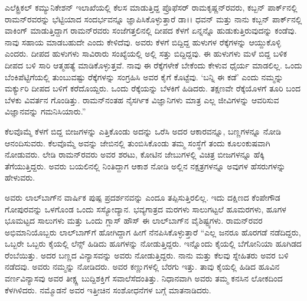 ಎಲೆಕ್ಟ್ರಿಕಲ್ ಕಮ್ಯುನಿಕೇಶನ್ ಇಲಾಖೆಯಲ್ಲಿ ಕೆಲಸ ಮಾಡುತ್ತಿದ್ದ ಪ್ರೊಫೆಸರ್ ರಾಮಕೃಷ್ಣನ್‌ರವರು, ಕಬ್ಬನ್ ಪಾರ್ಕ್‌ನಲ್ಲಿ ರಾಮನ್‌ರವರನ್ನು ಭೆಟ್ಟಿಯಾದ ಸಂದರ್ಭವನ್ನೂ ಜ್ಞಾಪಿಸಿಕೊಳ್ಳುತ್ತಾರೆ \enginline{-} ಡಾ।। ಧವನ್ ಮತ್ತು ನಾನು ಕಬ್ಬನ್ ಪಾರ್ಕ್‌ನಲ್ಲಿ ವಾಕಿಂಗ್ ಮಾಡುತ್ತಿದ್ದಾಗ ರಾಮನ್‌ರವರು ಸಂಜೆಗತ್ತಲಿನಲ್ಲಿ ದೀಪದ ಕೆಳಗೆ ಏನ್ನನ್ನೊ ಹುಡುಕುತ್ತಿರುವುದನ್ನು ಕಂಡೆವು. ನಾವು ಸಹಾಯ ಮಾಡಬಹುದೇ ಎಂದು ಕೇಳಿದೆವು. ಅವರು ಕೆಳಗೆ ಬಿದ್ದಿದ್ದ ಹುಳುಗಳ ರೆಕ್ಕೆಗಳನ್ನು ಆಯ್ದುಕೊಳ್ಳಿ ಎಂದರು. ದೀಪದ ಹುಳುಗಳು ಸಾವಿರಾರು ಸಂಖ್ಯೆಯಲ್ಲಿ ಅಲ್ಲಿ ಸತ್ತು ಬಿದ್ದಿದ್ದವು. ಈ ಹುಳುಗಳು ಮಳೆ ಬಿದ್ದ ಬಳಿಕ ದೀಪದ ಬಳಿ ಸಾರಿ ಆತ್ಮಹತ್ಯೆ ಮಾಡಿಕೊಳ್ಳುತ್ತವೆ. ನಾವು ಈ ರೆಕ್ಕೆಗಳೇಕೆ ಬೇಕೆಂದು ಕೇಳುವ ಧೈರ್ಯ ಮಾಡಲಿಲ್ಲ. ಒಂದು ಬೆಂಕಿಪೆಟ್ಟಿಗೆಯಲ್ಲಿ ತುಂಬುವಷ್ಟು ರೆಕ್ಕೆಗಳನ್ನು ಸಂಗ್ರಹಿಸಿ ಅವರ ಕೈಗೆ ಕೊಟ್ಟೆವು. ‘ಬನ್ನಿ ಈ ಕಡೆ’ ಎಂದು ನಮ್ಮನ್ನು ಮರ್ಕ್ಯುರಿ ದೀಪದ ಬಳಿಗೆ ಕರೆದೊಯ್ದರು. ಒಂದು ರೆಕ್ಕೆಯನ್ನು ಬೆಳಕಿಗೆ ಹಿಡಿದರು. ತಕ್ಷಣವೇ ರೆಕ್ಕೆಯೊಳಗೆ ತೂರಿ ಬಂದ ಬೆಳಕು ವಿವರ್ತನ ಗೊಂಡಿತ್ತು. ರಾಮನ್‌ನಂತಹ ನೈಸರ್ಗಿಕ ವಿಜ್ಞಾನಿಗಳು ಮಾತ್ರ ಎಲ್ಲ ಜೀವಿಗಳನ್ನು ಆವರಿಸುವ ವಿಜ್ಞಾನವನ್ನು ಗಮನಿಸಿಯಾರು.” 

ಕೆಲವೊಮ್ಮೆ ಕೆಳಗೆ ಬಿದ್ದ ಬೀಜಗಳನ್ನು ಎತ್ತಿಕೊಂಡು ಅದನ್ನು ಒರೆಸಿ ಅದರ ಆಕಾರವನ್ನೂ, ಬಣ್ಣಗಳನ್ನೂ ನೋಡಿ ಆನಂದಿಸುವರು. ಕೆಲವೊಮ್ಮೆ ಅವನ್ನು ಜೇಬಿನಲ್ಲಿ ತುಂಬಿಸಿಕೊಂಡು ತಮ್ಮ ಸಂಸ್ಥೆಗೆ ತಂದು ಕೂಲಂಕುಷವಾಗಿ ನೋಡುವರು. ಲೇಡಿ ರಾಮನ್‌ರವರು ಅವರ ಶರಟು, ಕೋಟಿನ ಜೇಬುಗಳಲ್ಲಿ ವಿಚಿತ್ರ ಬೀಜಗಳನ್ನೂ ಹೆಕ್ಕಿ ತೆಗೆಯುತ್ತಿದ್ದರು. ಅವರು ಬಯಲಿನಲ್ಲಿ ನಿಂತಿದ್ದಾಗ ಆಕಾಶ ನೋಡಿ ಅಲ್ಲಿನ ನಕ್ಷತ್ರಗಳನ್ನೂ ಅವುಗಳ ಹೆಸರುಗಳನ್ನು ಹೇಳುವರು. 

ಅವರು ಲಾಲ್‌ಬಾಗ್‍ನ ವಾರ್ಷಿಕ ಪುಷ್ಪ ಪ್ರದರ್ಶನವನ್ನು ಎಂದೂ ತಪ್ಪಿಸುತ್ತಿರಲಿಲ್ಲ. ಇದು ದಕ್ಷಿಣದ ಕೆಂಪೇಗೌಡ ಗೋಪುರವನ್ನು ಒಳಗೊಂಡ ಒಂದು ಸಸ್ಯೋದ್ಯಾನ. ಭವ್ಯಗಾತ್ರದ ಮರಗಳು ಸಾಲುಗಟ್ಟಲೆ ಹೂಮರಗಳು, ಹೂಗಳ ಭೂಮಟ್ಟದ ಸಾಲುಗಳು ಮತ್ತು ಒಂದು ಗ್ಲಾಸ್ ಹೌಸ್ ಈ ಲಾಲ್‌ಬಾಗ್‍‌ನ ವೈಶಿಷ್ಟ್ಯಗಳು. ರಾಮನ್‌ರವರ ಅಭಿಮಾನಿಯೊಬ್ಬರು ಲಾಲ್‌ಬಾಗ್‌ಗೆ ಹೋಗಿದ್ದಾಗ ಹೀಗೆ ನೆನಪಿಸಿಕೊಳ್ಳುತ್ತಾರೆ\enginline{-} “ಎಲ್ಲ ಜನರೂ ಹೊರಗಡೆ ನಡೆದಿದ್ದರು, ಒಬ್ಬರೇ ಒಬ್ಬರು ಕೈಯಲ್ಲಿ ಲೆನ್ಸ್ ಹಿಡಿದು ಹೂಗಳನ್ನು ನೋಡುತ್ತಿದ್ದರು. ಇನ್ನೊಂದು ಕೈಯಲ್ಲಿ ಬೆಗೋನಿಯಾ ಹೂಗಿಡದ ರೆಂಬೆಯಿತ್ತು. ಅದರ ಬಣ್ಣದ ವಿನ್ಯಾಸವನ್ನು ಅವರು ನೋಡುತ್ತಿದ್ದರು. ನಾನು ಮತ್ತು ಕೆಲವು ಸ್ನೇಹಿತರು ಅವರ ಬಳಿ ನಡೆದವು. ಅವರು ನಮ್ಮನ್ನು ನೋಡಿದರು. ಅವರ ಕಣ್ಣುಗಳಲ್ಲಿ ಬೆರಗು ಇತ್ತು. ತಾವು ಕೈಯಲ್ಲಿ ಹಿಡಿದ ಹೂವಿನ ವರ್ಣವಿನ್ಯಾಸವು ಅವರ ತೀಕ್ಷ್ಣ ಬುದ್ದಿಶಕ್ತಿಗೆ ಸವಾಲೆಸೆದಂತಿತ್ತು. ನಿಧಾನವಾಗಿ ಅವರು ತಮ್ಮ ಕನಸಿನ ಲೋಕದಿಂದ ಕೆಳಗಿಳಿದರು. ನಮ್ಮೊಡನೆ ಅವರ ಇತ್ತೀಚಿನ ಸಂಶೋಧನೆಗಳ ಬಗ್ಗೆ ಮಾತನಾಡಿದರು. 

